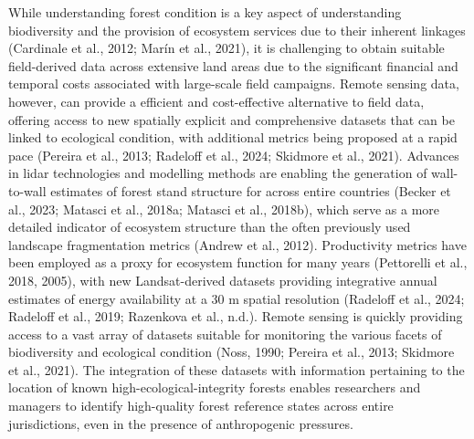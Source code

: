 \documentclass[
]{agujournal2019}
\begin{document}
While understanding forest condition is a key aspect of understanding
biodiversity and the provision of ecosystem services due to their
inherent linkages (Cardinale et al., 2012; Marín et al., 2021), it is
challenging to obtain suitable field-derived data across extensive land
areas due to the significant financial and temporal costs associated
with large-scale field campaigns. Remote sensing data, however, can
provide a efficient and cost-effective alternative to field data,
offering access to new spatially explicit and comprehensive datasets
that can be linked to ecological condition, with additional metrics
being proposed at a rapid pace (Pereira et al., 2013; Radeloff et al.,
2024; Skidmore et al., 2021). Advances in lidar technologies and
modelling methods are enabling the generation of wall-to-wall estimates
of forest stand structure for across entire countries (Becker et al.,
2023; Matasci et al., 2018a; Matasci et al., 2018b), which serve as a
more detailed indicator of ecosystem structure than the often previously
used landscape fragmentation metrics (Andrew et al., 2012). Productivity
metrics have been employed as a proxy for ecosystem function for many
years (Pettorelli et al., 2018, 2005), with new Landsat-derived datasets
providing integrative annual estimates of energy availability at a 30 m
spatial resolution (Radeloff et al., 2024; Radeloff et al., 2019;
Razenkova et al., n.d.). Remote sensing is quickly providing access to a
vast array of datasets suitable for monitoring the various facets of
biodiversity and ecological condition (Noss, 1990; Pereira et al., 2013;
Skidmore et al., 2021). The integration of these datasets with
information pertaining to the location of known
high-ecological-integrity forests enables researchers and managers to
identify high-quality forest reference states across entire
jurisdictions, even in the presence of anthropogenic pressures.
\end{document}
